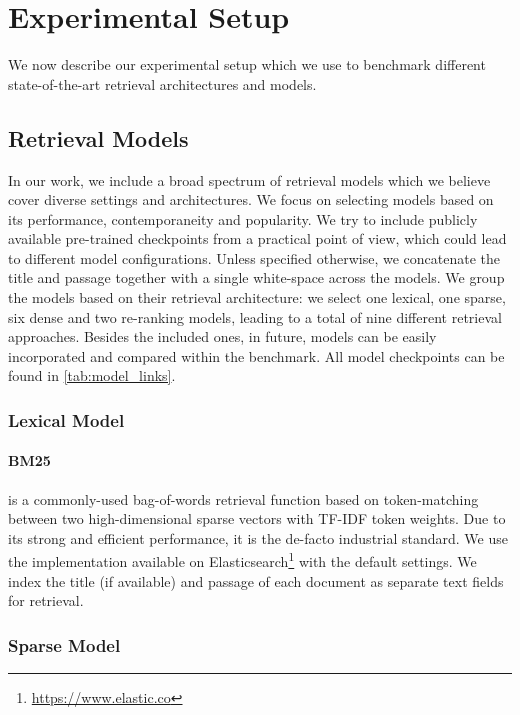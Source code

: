 \documentclass[11pt]{article}
\begin{document}
\section{Experimental Setup}
We now describe our experimental setup which we use to benchmark different state-of-the-art retrieval architectures and models. 

\subsection{Retrieval Models}
In our work, we include a broad spectrum of retrieval models which we believe cover diverse settings and architectures. We focus on selecting models based on its performance, contemporaneity and popularity. 
We try to include publicly available pre-trained checkpoints from a practical point of view, which could lead to different model configurations. 
Unless specified otherwise, we concatenate the title and passage together with a single white-space across the models. 
We group the models based on their retrieval architecture: we select one lexical, one sparse, six dense and two re-ranking models, leading to a total of nine different retrieval approaches. Besides the included ones, in future, models can be easily incorporated and compared within the benchmark. All model checkpoints can be found in \autoref{tab:model_links}.

\subsubsection{Lexical Model}

\paragraph{\textbf{BM25}} \cite{bm25} is a commonly-used  bag-of-words retrieval function based on token-matching between two high-dimensional sparse vectors with TF-IDF token weights. Due to its strong and efficient performance, it is the de-facto industrial standard. We use the implementation available on Elasticsearch\footnote{\href{https://www.elastic.co}{https://www.elastic.co}} with the default settings. We index the title (if available) and passage of each document as separate text fields for retrieval.


\subsubsection{Sparse Model}
\end{document}
